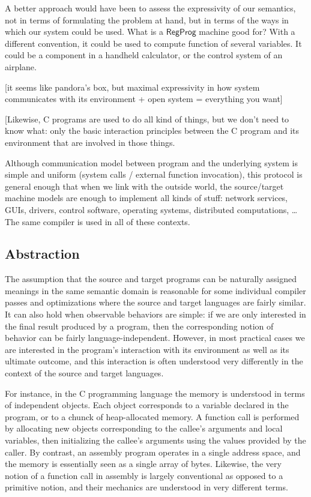 \documentclass[sigplan,10pt,review,anonymous]{acmart}
\newcommand{\kw}[1]{\ensuremath{ \textsf{#1} }}
\begin{document}
A better approach would have been to
assess the expressivity of our semantics,
not in terms of formulating the problem at hand,
but in terms of the ways in which our system
could be used.
What is a $\kw{RegProg}$ machine good for?
With a different convention,
it could be used to compute function of several variables.
It could be a component in a handheld calculator,
or the control system of an airplane.

[it seems like pandora's box,
but maximal expressivity in how system communicates with its environment
+ open system = everything you want]




[Likewise, C programs are used to do all kind of things,
but we don't need to know what:
only the basic interaction principles
between the C program and its environment that are involved
in those things.





Although communication model between program
and the underlying system is simple and uniform
(system calls / external function invocation),
this protocol is general enough that
when we link with the outside world,
the source/target machine models are enough to
implement all kinds of stuff:
network services, GUIs, drivers, control software,
operating systems, distributed computations, \ldots
The same compiler is used in all of these contexts.


\subsection{Abstraction} %

The assumption that the source and target programs
can be naturally assigned meanings in the same semantic domain
is reasonable for some individual compiler passes and optimizations
where the source and target languages are fairly similar.
It can also hold when observable behaviors are simple:
if we are only interested in the final result produced by a program,
then the corresponding notion of behavior
can be fairly language-independent.
However,
in most practical cases we are interested in
the program's interaction with its environment
as well as its ultimate outcome,
and this interaction is often understood very differently
in the context of the source and target languages.

For instance,
in the C programming language
the memory is understood in terms of independent objects.
Each object corresponds to a variable declared in the program,
or to a chunck of heap-allocated memory.
A function call is performed by allocating new objects
corresponding to the callee's arguments and local variables,
then initializing the callee's arguments
using the values provided by the caller.
By contrast,
an assembly program
operates in a single address space,
and the memory is essentially seen as a single array of bytes.
Likewise,
the very notion of a function call in assembly
is largely conventional as opposed to a primitive notion,
and their mechanics are understood in very different terms.
\end{document}
